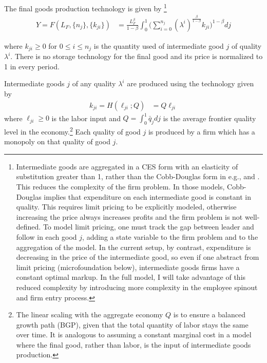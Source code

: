 \documentclass[11pt,english]{article}
\theoremstyle{remark}
\begin{document}
The final goods production technology is given by \footnote{Intermediate goods are aggregated in a CES form with an elasticity of substitution greater than 1, rather than the Cobb-Douglas form in e.g., \cite{grossman_quality_1991} and \cite{baslandze_spinout_2019}. This reduces the complexity of the firm problem. In those models, Cobb-Douglas implies that expenditure on each intermediate good is constant in quality. This requires limit pricing to be explicitly modeled, otherwise increasing the price always increases profits and the firm problem is not well-defined. To model limit pricing, one must track the gap between leader and follow in each good $j$, adding a state variable to the firm problem and to the aggregation of the model. In the current setup, by contrast, expenditure is decreasing in the price of the intermediate good, so even if one abstract from limit pricing (microfoundation below), intermediate goods firms have a constant optimal markup. In the full model, I will take advantage of this reduced complexity by introducing more complexity in the employee spinout and firm entry process.}
\begin{align}
Y = F(L_F,\{n_j\},\{k_{ji}\}) &= \frac{L_F^{\beta}}{1-\beta} \int_0^1 \Big(\sum_{i = 0}^{n_{j}} (\lambda^{i})^{\frac{\beta}{1-\beta}} k_{ji} \Big)^{1-\beta} dj \label{final_goods_production}
\end{align}

where $k_{ji} \ge 0$ for $0 \le i \le n_j$ is the quantity used of intermediate good $j$ of quality $\lambda^i$. There is no storage technology for the final good and its price is normalized to 1 in every period. 

Intermediate goods $j$ of any quality $\lambda^i$ are produced using the technology given by 
\begin{align}
k_{ji} = H(\ell_{ji};Q) &= Q \ell_{ji} \label{intermediate_goods_production}
\end{align}
where $\ell_{ji} \ge 0$ is the labor input and $Q = \int_0^1 \bar{q}_{j} dj$ is the average frontier quality level in the economy.\footnote{The linear scaling with the aggregate economy $Q$ is to ensure a balanced growth path (BGP), given that the total quantity of labor stays the same over time. It is analogous to assuming a constant marginal cost in a model where the final good, rather than labor, is the input of intermediate goods production.} Each quality of good $j$ is produced by a firm which has a monopoly on that quality of good $j$. 
\end{document}

